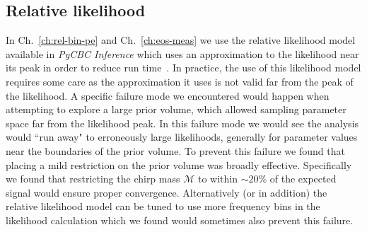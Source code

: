 \subsection{Relative likelihood}
In Ch.~\ref{ch:rel-bin-pe} and Ch.~\ref{ch:eos-meas} we use the relative likelihood model available in \textit{PyCBC Inference} which uses an approximation to the likelihood near its peak in order to reduce run time~\cite{Cornish:2010kf,Zackay:2018qdy,Finstad:2020sok}. In practice, the use of this likelihood model requires some care as the approximation it uses is not valid far from the peak of the likelihood. A specific failure mode we encountered would happen when attempting to explore a large prior volume, which allowed sampling parameter space far from the likelihood peak. In this failure mode we would see the analysis would ``run away" to erroneously large likelihoods, generally for parameter values near the boundaries of the prior volume. To prevent this failure we found that placing a mild restriction on the prior volume was broadly effective. Specifically we found that restricting the chirp mass $\mathcal{M}$ to within $\sim 20\%$ of the expected signal would ensure proper convergence. Alternatively (or in addition) the relative likelihood model can be tuned to use more frequency bins in the likelihood calculation which we found would sometimes also prevent this failure.